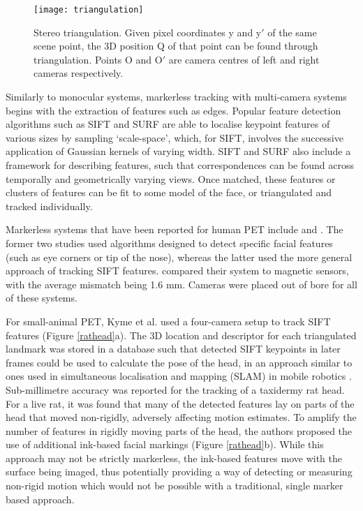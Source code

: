 \documentclass[class=article, crop=false]{standalone}
\begin{document}
\begin{figure}
	\centering
	\texttt{[image: triangulation]}
	\caption{Stereo triangulation. Given pixel coordinates y and y$'$ of the same scene point, the 3D position Q of that point can be found through triangulation. Points O and O$'$ are camera centres of left and right cameras respectively.}
	\label{triangulation}
\end{figure}

\par 
Similarly to monocular systems, markerless tracking with multi-camera systems begins with the extraction of features such as edges. Popular feature detection algorithms such as SIFT \parencite{Lowe2004} and SURF \parencite{Bay2008} are able to localise keypoint features of various sizes by sampling `scale-space', which, for SIFT, involves the successive application of Gaussian kernels of varying width. SIFT and SURF  also include a framework for describing features, such that correspondences can be found across temporally and geometrically varying views. Once matched, these features or clusters of features can be fit to some model of the face, or triangulated and tracked individually.
\par 
Markerless systems that have been reported for human PET include \cite{Anishchenko2015,Gao2007} and \cite{Ma2008}. The former two studies used algorithms designed to detect specific facial features (such as eye corners or tip of the nose), whereas the latter used the more general approach of tracking SIFT features. \cite{Anishchenko2015} compared their system to magnetic sensors, with the average mismatch being 1.6 mm. Cameras were placed out of bore for all of these systems.
\par
For small-animal PET, Kyme et al. \parencite*{Kyme2014} used a four-camera setup to track SIFT features (Figure \ref{rathead}a). The 3D location and descriptor for each triangulated landmark was stored in a database such that detected SIFT keypoints in later frames could be used to calculate the pose of the head, in an approach similar to ones used in simultaneous localisation and mapping (SLAM) in mobile robotics \parencite{Se2002,Se2005}. Sub-millimetre accuracy was reported for the tracking of a taxidermy rat head. For a live rat, it was found that many of the detected features lay on parts of the head that moved non-rigidly, adversely affecting motion estimates. To amplify the number of features in rigidly moving parts of the head, the authors proposed the use of additional ink-based facial markings (Figure \ref{rathead}b). While this approach may not be strictly markerless, the ink-based features move with the surface being imaged, thus potentially providing a way of detecting or measuring non-rigid motion which would not be possible with a traditional, single marker based approach.
\end{document}
